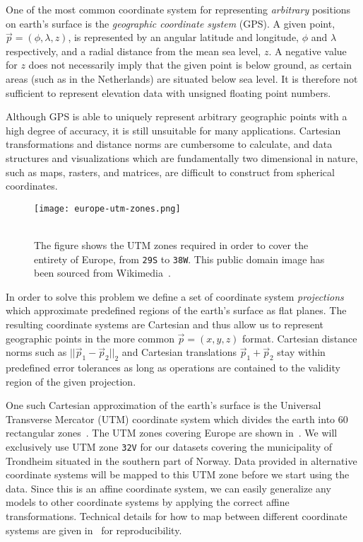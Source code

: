 One of the most common coordinate system for representing \textit{arbitrary} positions on earth's surface is the \textit{geographic coordinate system} (GPS).
A given point, $\vec{p} = (\phi, \lambda, z)$, is represented by an angular latitude and longitude, $\phi$ and $\lambda$ respectively, and a radial distance from the mean sea level, $z$.
A negative value for $z$ does not necessarily imply that the given point is below ground, as certain areas (such as in the Netherlands) are situated below sea level.
It is therefore not sufficient to represent elevation data with unsigned floating point numbers.

Although GPS is able to uniquely represent arbitrary geographic points with a high degree of accuracy, it is still unsuitable for many applications.
Cartesian transformations and distance norms are cumbersome to calculate, and data structures and visualizations which are fundamentally two dimensional in nature, such as maps, rasters, and matrices, are difficult to construct from spherical coordinates.

\begin{wrapfigure}[20]{r}{0.38\linewidth}
  \vspace{-1em}
  \centering
  \texttt{[image: europe-utm-zones.png]}
  \caption{%
    \\
    The figure shows the UTM zones required in order to cover the entirety of Europe, from \texttt{29S} to \texttt{38W}.
    This public domain image has been sourced from Wikimedia~\cite{wiki:europe_utm_zones}.
  }%
  \label{fig:europe-utm-zones}
\end{wrapfigure}

In order to solve this problem we define a set of coordinate system \textit{projections} which approximate predefined regions of the earth's surface as flat planes.
The resulting coordinate systems are Cartesian and thus allow us to represent geographic points in the more common $\vec{p} = (x, y, z)$ format.
Cartesian distance norms such as $||\vec{p}_1 - \vec{p}_2||_2$ and Cartesian translations $\vec{p}_1 + \vec{p}_2$ stay within predefined error tolerances as long as operations are contained to the validity region of the given projection.

One such Cartesian approximation of the earth's surface is the Universal Transverse Mercator (UTM) coordinate system which divides the earth into 60 rectangular zones~\cite[p.~48]{map-projections}. The UTM zones covering Europe are shown in~.
We will exclusively use UTM zone \texttt{32V} for our datasets covering the municipality of Trondheim situated in the southern part of Norway.
Data provided in alternative coordinate systems will be mapped to this UTM zone before we start using the data.
Since this is an affine coordinate system, we can easily generalize any models to other coordinate systems by applying the correct affine transformations.
Technical details for how to map between different coordinate systems are given in~ for reproducibility.
